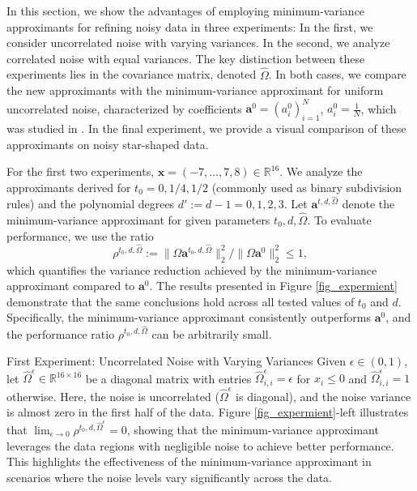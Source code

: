 \documentclass[preprint]{elsarticle}       %
\newcommand{\R}{\mathds{R}}
\newcommand{\ba}{\bm{a}}
\newcommand{\bx}{\bm{x}}
\theoremstyle{plain}
\theoremstyle{remark}
\begin{document}
In this section, we show the advantages of employing minimum-variance approximants for refining noisy data in three experiments: In the first, we consider uncorrelated noise with varying variances. In the second, we analyze correlated noise with equal variances. The key distinction between these experiments lies in the covariance matrix, denoted $\hat\Omega$. In both cases, we compare the new approximants with the minimum-variance approximant for uniform uncorrelated noise, characterized by coefficients $\ba^0 = (a^0_i)_{i=1}^N$, $a^0_i = \frac1N$, which was studied in \cite{DHHS15,LUYA}. In the final experiment, we provide a visual comparison of these approximants on noisy star-shaped data.

For the  first two experiments, $\bx = (-7,\ldots,7,8)\in\R^{16}$. We analyze the approximants derived for $t_0 = 0,1/4,1/2$ (commonly used as binary subdivision rules) and the polynomial degrees $d' := d-1 = 0,1,2,3$. Let $\ba^{t,d,\hat \Omega}$ denote the minimum-variance approximant for given parameters $t_0,d,\hat \Omega$. To evaluate performance, we use the ratio
\begin{equation} \label{eq:rho}
    \rho^{t_0,d,\hat \Omega}:=\|\Omega \ba^{t_0,d,\hat \Omega}\|_2^2 / \|\Omega \ba^0\|_2^2 \leq 1,
\end{equation}
which quantifies the variance reduction achieved by the minimum-variance approximant compared to $\ba^0$. The results presented in Figure \ref{fig_expermient} demonstrate that the same conclusions hold across all tested values of $t_0$ and $d$. Specifically, the minimum-variance approximant consistently outperforms $\ba^0$, and the performance ratio $\rho^{t_0,d,\hat \Omega}$ can be arbitrarily small.

\begin{paragraph}{First Experiment: Uncorrelated Noise with Varying Variances}
	Given $\epsilon\in(0,1)$, let $\hat\Omega^\epsilon\in\R^{16\times16}$ be a diagonal matrix with entries $\hat\Omega^\epsilon_{i,i} = \epsilon$ for $x_i \leq 0$ and $\hat\Omega^\epsilon_{i,i} = 1$ otherwise. Here, the noise is uncorrelated ($\hat\Omega^\epsilon$ is diagonal), and the noise variance is almost zero in the first half of the data. Figure \ref{fig_expermient}-left illustrates that $\lim_{\epsilon\to0} \rho^{t_0,d,\hat \Omega^\epsilon} = 0$, showing that the minimum-variance approximant leverages the data regions with negligible noise to achieve better performance.
    This highlights the effectiveness of the minimum-variance approximant in scenarios where the noise levels vary significantly across the data.
\end{paragraph}
\end{document}
